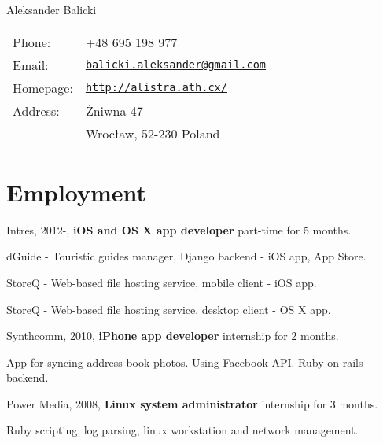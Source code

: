 \documentclass[letterpaper]{article}
\def\name{Aleksander Balicki}
\renewenvironment{itemize}{
  \begin{list}{}{
    \setlength{\leftmargin}{1.5em}
  }
}{
  \end{list}
}
\begin{document}
{\huge \name}


\vspace{0.25in}

\begin{minipage}{0.45\linewidth}
  \begin{tabular}{ll}
    Phone: 	& +48 695 198 977 \\
    Email: 	& \href{mailto:balicki.aleksander@gmail.com}{\tt balicki.aleksander@gmail.com} \\
    Homepage: 	& \href{http://alistra.ath.cx/}{\tt http://alistra.ath.cx/} \\
    Address: 	& Żniwna 47\\
    		& Wrocław, 52-230 Poland
  \end{tabular}
\end{minipage}

\section*{Employment}

\begin{itemize}
	\item Intres, 2012-, {\bf iOS and OS X app developer} part-time for 5 months.
		\begin{itemize}
			\item dGuide - Touristic guides manager, Django backend - iOS app, App Store.
			\item StoreQ - Web-based file hosting service, mobile client - iOS app.
			\item StoreQ - Web-based file hosting service, desktop client - OS X app.
		\end{itemize}
	\item Synthcomm, 2010, {\bf iPhone app developer} internship for 2 months.
		\begin{itemize}
			\item App for syncing address book photos. Using Facebook API. Ruby on rails backend.
		\end{itemize}
	\item Power Media, 2008, {\bf Linux system administrator} internship for 3 months.
		\begin{itemize}
			\item Ruby scripting, log parsing, linux workstation and network management.
		\end{itemize}
\end{itemize}
\end{document}

